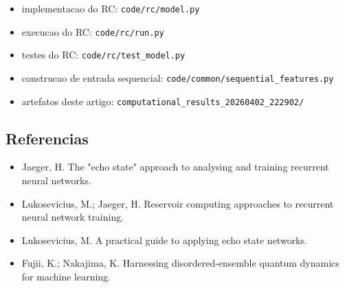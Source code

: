 \documentclass[12pt]{article}
\providecommand{\tightlist}{%
          \setlength{\itemsep}{0pt}\setlength{\parskip}{0pt}}
\begin{document}
\begin{itemize}
\tightlist
\item
  implementacao do RC: \texttt{code/rc/model.py}
\item
  execucao do RC: \texttt{code/rc/run.py}
\item
  testes do RC: \texttt{code/rc/test\_model.py}
\item
  construcao de entrada sequencial: \texttt{code/common/sequential\_features.py}
\item
  artefatos deste artigo: \texttt{computational\_results\_20260402\_222902/}
\end{itemize}

\subsection{Referencias}\label{referencias}

\begin{itemize}
\tightlist
\item
  Jaeger, H. The "echo state" approach to analysing and training recurrent neural networks.
\item
  Lukosevicius, M.; Jaeger, H. Reservoir computing approaches to recurrent neural network training.
\item
  Lukosevicius, M. A practical guide to applying echo state networks.
\item
  Fujii, K.; Nakajima, K. Harnessing disordered-ensemble quantum dynamics for machine learning.
\end{itemize}

        
\end{document}
